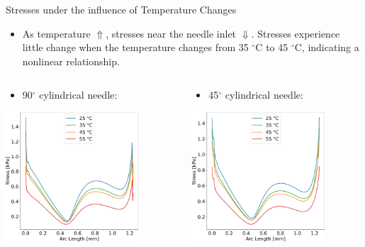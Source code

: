\begin{frame}{Stresses under the influence of Temperature Changes}

\footnotesize
\begin{itemize}
    \item As temperature $\Uparrow$, stresses near the needle inlet $\Downarrow$. Stresses experience little change when the temperature changes from 35 $^{\circ}$C to 45 $^{\circ}$C, indicating a nonlinear relationship.
\end{itemize}
\vspace{-3.5mm}
\begin{columns}
\begin{column}{.333\textwidth}
\begin{itemize}
    \item 90$^{\circ}$ cylindrical needle:
\end{itemize}
\vspace{0.5mm}
\centering
\includegraphics[trim = 0mm 0mm 0mm 0mm, clip, width=1.95in]{./images/90_ssdata_sphere.png}
\end{column}

\begin{column}{.333\textwidth}
\begin{itemize}
    \item 45$^{\circ}$ cylindrical needle:
\end{itemize}
\vspace{0.5mm}
\centering
\includegraphics[trim = 0mm 0mm 0mm 0mm, clip, width=1.95in]{./images/45_ssdata_sphere.png}
\end{column}


\end{columns}
\end{frame}
